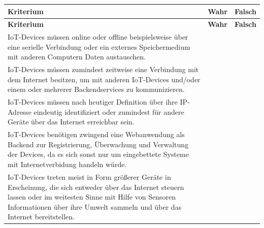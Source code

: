 \newcommand{\DefinitionIoT}[1]{
    {
        \renewcommand{\arraystretch}{1.5}
        \begin{longtable}{|p{0.71\textwidth}|p{0.1\textwidth}|p{0.1\textwidth}|}
            \hline
            \textbf{Kriterium} & \textbf{Wahr} & \textbf{Falsch} \\
            \endfirsthead

            \hline
            \textbf{Kriterium} & \textbf{Wahr} & \textbf{Falsch} \\
            \endhead

            \hline
            \endlastfoot

            \hline %
            IoT-Devices müssen online oder offline beispielsweise über eine
            serielle Verbindung oder ein externes Speichermedium mit anderen
            Computern Daten austauschen.
            &
            & #1
            \\

            \hline %
            IoT-Devices müssen zumindest zeitweise eine Verbindung mit dem
            Internet besitzen, um mit anderen IoT-Devices und/oder einem oder
            mehrerer Backendservices zu kommunizieren.
            & #1
            &
            \\

            \hline %
            IoT-Devices müssen nach heutiger Definition über ihre IP-Adresse
            eindeutig identifiziert oder zumindest für andere Geräte über das
            Internet erreichbar sein.
            & #1
            &
            \\

            \hline %
            IoT-Devices benötigen zwingend eine Webanwendung als Backend zur
            Registrierung, Überwachung und Verwaltung der Devices, da es sich
            sonst nur um eingebettete Systeme mit Internetverbidung handeln würde.
            &
            & #1
            \\

            \hline %
            IoT-Devices treten meist in Form größerer Geräte in Erscheinung,
            die sich entweder über das Internet steuern lassen oder im weitesten
            Sinne mit Hilfe von Sensoren Informationen über ihre Umwelt sammeln
            und über das Internet bereitstellen.
            & #1
            &
            \\
        \end{longtable}
    }
}
\DefinitionIoT{}

